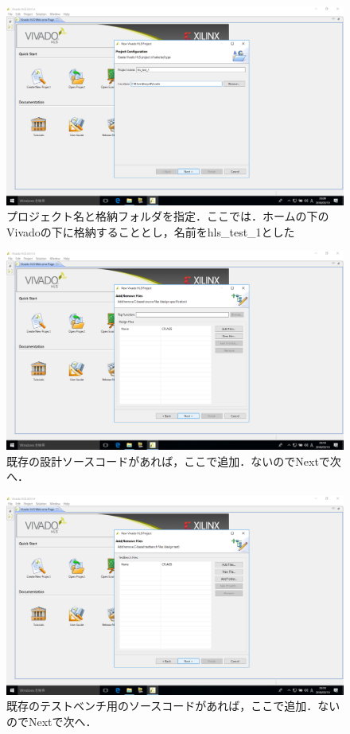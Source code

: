 \documentclass[a4paper,dvipdfmx]{jsarticle}
\begin{document}
 \begin{figure}[H]
  \begin{center}
   \includegraphics[width=.8\textwidth]{chapter08_figures/VirtualBox_Windows10_19_03_2018_23_10_00.png}
  \end{center}
  \caption{プロジェクト名と格納フォルダを指定．ここでは．ホームの下のVivadoの下に格納することとし，名前をhls\_test\_1とした}
 \end{figure}

 \begin{figure}[H]
  \begin{center}
   \includegraphics[width=.8\textwidth]{chapter08_figures/VirtualBox_Windows10_19_03_2018_23_10_06.png}
  \end{center}
  \caption{既存の設計ソースコードがあれば，ここで追加．ないのでNextで次へ．}
 \end{figure}

 \begin{figure}[H]
  \begin{center}
   \includegraphics[width=.8\textwidth]{chapter08_figures/VirtualBox_Windows10_19_03_2018_23_10_10.png}
  \end{center}
  \caption{既存のテストベンチ用のソースコードがあれば，ここで追加．ないのでNextで次へ．}
 \end{figure}
\end{document}

